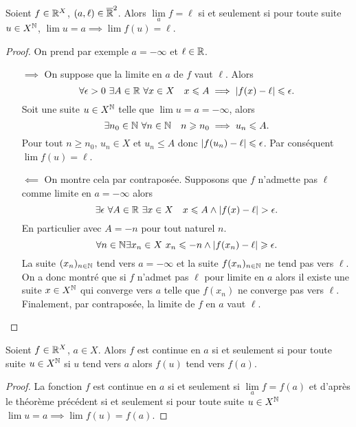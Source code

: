 \begin{theo}
  Soient $f \in \mathbb{R}^X$, $(a,\ell) \in \overline{\mathbb{R}}^2$. Alors $\lim\limits_{a} f=\ell$ si et seulement si pour toute suite $u \in X^{\mathbb{N}}$, $\lim u =a \implies \lim f(u)=\ell$.
\end{theo}
\begin{proof}
  On prend par exemple $a=-\infty$ et $\ell \in \mathbb{R}$.
  \begin{itemize}
  \item[$\implies$] On suppose que la limite en $a$ de $f$ vaut $\ell$. Alors
    \begin{equation}
      \forall \epsilon > 0 \ \exists A \in \mathbb{R} \ \forall x \in X \quad x \leqslant A \implies \left\lvert f(x)-\ell\right\rvert \leqslant \epsilon.
    \end{equation}
    Soit une suite $u \in X^{\mathbb{N}}$ telle que $\lim u = a =-\infty$, alors
    \begin{equation}
      \exists n_0 \in \mathbb{N} \ \forall n \in \mathbb{N} \quad n \geqslant n_0 \implies u_n \leqslant A.
    \end{equation}
    Pour tout $n \geqslant n_0$, $u_n \in X$ et $u_n \leqslant A$ donc $\left\lvert f(u_n) -\ell\right\rvert \leqslant \epsilon$. Par conséquent $\lim f(u)=\ell$.
  \item[$\impliedby$] On montre cela par contraposée. Supposons que $f$ n'admette pas $\ell$ comme limite en $a=-\infty$ alors
    \begin{equation}
      \exists \epsilon \ \forall A \in \R \ \exists x \in X \quad x \leqslant A \wedge \abs{f(x)-\ell} > \epsilon.
    \end{equation}
    En particulier avec $A=-n$ pour tout naturel $n$.
    \begin{equation}
      \forall n \in \mathbb{N} \exists x_n \in X \ x_n \leqslant -n \wedge \left\lvert f(x_n)-\ell\right\rvert \geqslant \epsilon.
    \end{equation}
    La suite $(x_n)_{n \in \mathbb{N}}$ tend vers $a=-\infty$ et la suite $f(x_n)_{n \in \mathbb{N}}$ ne tend pas vers $\ell$. On a donc montré que si $f$ n'admet pas $\ell$ pour limite en $a$ alors il existe une suite $x \in X^{\mathbb{N}}$ qui converge vers $a$ telle que $f(x_n)$ ne converge pas vers $\ell$. Finalement, par contraposée, la limite de $f$ en $a$ vaut $\ell$.
  \end{itemize}
\end{proof}
\begin{theo}
  Soient $f \in \mathbb{R}^X$, $a \in X$. Alors $f$ est continue en $a$ si et seulement si pour toute suite $u \in X^{\mathbb{N}}$ si $u$ tend vers $a$ alors $f(u)$ tend vers $f(a)$.
\end{theo}
\begin{proof}
  La fonction $f$ est continue en $a$ si et seulement si $\lim\limits_{a}f = f(a)$ et d'après le théorème précédent si et seulement si pour toute suite $u \in X^{\mathbb{N}}$ $\lim u =a \implies \lim f(u)=f(a)$.
\end{proof}

